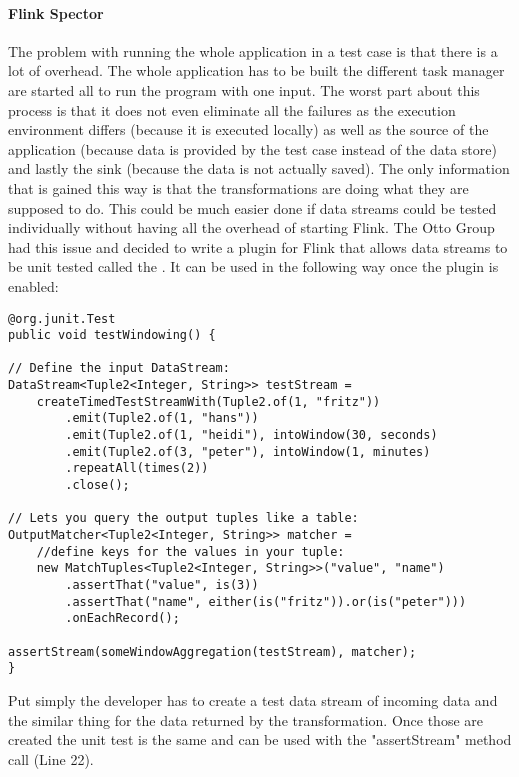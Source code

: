 \paragraph{Flink Spector} The problem with running the whole application in a test case is that there is a lot of overhead. The whole application has to be built the different task manager are started all to run the program with one input. The worst part about this process is that it does not even eliminate all the failures as the execution environment differs (because it is executed locally) as well as the source of the application (because data is provided by the test case instead of the data store) and lastly the sink (because the data is not actually saved). The only information that is gained this way is that the transformations are doing what they are supposed to do. This could be much easier done if data streams could be tested individually without having all the overhead of starting Flink. The Otto Group had this issue and decided to write a plugin for Flink that allows data streams to be unit tested called the \cite{FlinkSpector}. It can be used in the following way once the plugin is enabled:

\begin{lstlisting}[caption={FlinkSpector Example: \cite{FlinkSpector}}]
@org.junit.Test
public void testWindowing() {

// Define the input DataStream:
DataStream<Tuple2<Integer, String>> testStream =
    createTimedTestStreamWith(Tuple2.of(1, "fritz"))
        .emit(Tuple2.of(1, "hans"))
        .emit(Tuple2.of(1, "heidi"), intoWindow(30, seconds)
        .emit(Tuple2.of(3, "peter"), intoWindow(1, minutes)
        .repeatAll(times(2))
        .close();

// Lets you query the output tuples like a table:
OutputMatcher<Tuple2<Integer, String>> matcher =
    //define keys for the values in your tuple:
    new MatchTuples<Tuple2<Integer, String>>("value", "name")
        .assertThat("value", is(3))
        .assertThat("name", either(is("fritz")).or(is("peter")))
        .onEachRecord();

assertStream(someWindowAggregation(testStream), matcher);
}
\end{lstlisting}

Put simply the developer has to create a test data stream of incoming data and the similar thing for the data returned by the transformation. Once those are created the unit test is the same and can be used with the "assertStream" method call (Line 22).

